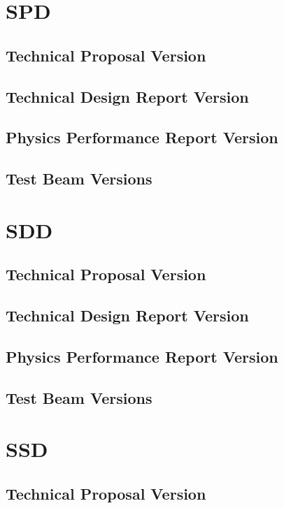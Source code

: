 \section{SPD}

\subsection{Technical Proposal Version}

\subsection{Technical Design Report Version}

\subsection{Physics Performance Report Version}

\subsection{Test Beam Versions}

\section{SDD}

\subsection{Technical Proposal Version}

\subsection{Technical Design Report Version}

\subsection{Physics Performance Report Version}

\subsection{Test Beam Versions}

\section{SSD}

\subsection{Technical Proposal Version}

